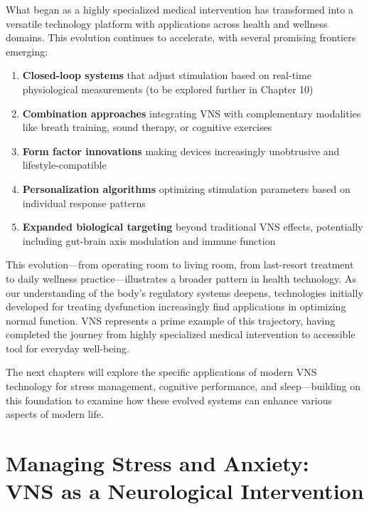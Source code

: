 \documentclass[
  Letterpaper,
]{scrbook}
\begin{document}
What began as a highly specialized medical intervention has transformed
into a versatile technology platform with applications across health and
wellness domains. This evolution continues to accelerate, with several
promising frontiers emerging:

\begin{enumerate}
\def\labelenumi{\arabic{enumi}.}
\item
  \textbf{Closed-loop systems} that adjust stimulation based on
  real-time physiological measurements (to be explored further in
  Chapter 10)
\item
  \textbf{Combination approaches} integrating VNS with complementary
  modalities like breath training, sound therapy, or cognitive exercises
\item
  \textbf{Form factor innovations} making devices increasingly
  unobtrusive and lifestyle-compatible
\item
  \textbf{Personalization algorithms} optimizing stimulation parameters
  based on individual response patterns
\item
  \textbf{Expanded biological targeting} beyond traditional VNS effects,
  potentially including gut-brain axis modulation and immune function
\end{enumerate}

This evolution---from operating room to living room, from last-resort
treatment to daily wellness practice---illustrates a broader pattern in
health technology. As our understanding of the body's regulatory systems
deepens, technologies initially developed for treating dysfunction
increasingly find applications in optimizing normal function. VNS
represents a prime example of this trajectory, having completed the
journey from highly specialized medical intervention to accessible tool
for everyday well-being.

The next chapters will explore the specific applications of modern VNS
technology for stress management, cognitive performance, and
sleep---building on this foundation to examine how these evolved systems
can enhance various aspects of modern life.


\chapter{Managing Stress and Anxiety: VNS as a Neurological
Intervention}\label{managing-stress-and-anxiety-vns-as-a-neurological-intervention}
\end{document}
